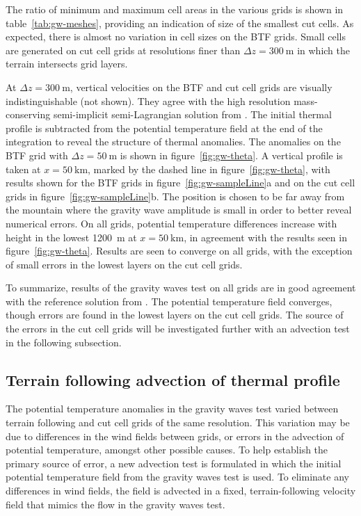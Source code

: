 \documentclass{ametsoc}
\begin{document}
The ratio of minimum and maximum cell areas in the various grids is shown in table~\ref{tab:gw-meshes}, providing an indication of size of the smallest cut cells.  As expected, there is almost no variation in cell sizes on the BTF grids.  Small cells are generated on cut cell grids at resolutions finer than $\Delta z = \SI{300}{\meter}$ in which the terrain intersects grid layers.

At $\Delta z = \SI{300}{\meter}$, vertical velocities on the BTF and cut cell grids are visually indistinguishable (not shown).  They agree with the high resolution mass-conserving semi-implicit semi-Lagrangian solution from \citet{melvin2010}.
The initial thermal profile is subtracted from the potential temperature field at the end of the integration to reveal the structure of thermal anomalies.  The anomalies on the BTF grid with $\Delta z = \SI{50}{\meter}$ is shown in figure~\ref{fig:gw-theta}.  A vertical profile is taken at $x = \SI{50}{\kilo\meter}$, marked by the dashed line in figure~\ref{fig:gw-theta}, with results shown for the BTF grids in figure~\ref{fig:gw-sampleLine}a and on the cut cell grids in figure~\ref{fig:gw-sampleLine}b.
The position is chosen to be far away from the mountain where the gravity wave amplitude is small in order to better reveal numerical errors.
On all grids, potential temperature differences increase with height in the lowest \SI{1200}{\meter} at $x = \SI{50}{\kilo\meter}$, in agreement with the results seen in figure~\ref{fig:gw-theta}.  Results are seen to converge on all grids, with the exception of small errors in the lowest layers on the cut cell grids.

To summarize, results of the gravity waves test on all grids are in good agreement with the reference solution from \citet{melvin2010}.  The potential temperature field converges, though errors are found in the lowest layers on the cut cell grids.  The source of the errors in the cut cell grids will be investigated further with an advection test in the following subsection.

\subsection{Terrain following advection of thermal profile}
The potential temperature anomalies in the gravity waves test varied between terrain following and cut cell grids of the same resolution.  This variation may be due to differences in the wind fields between grids, or errors in the advection of potential temperature, amongst other possible causes.  To help establish the primary source of error, a new advection test is formulated in which the initial potential temperature field from the gravity waves test is used.  To eliminate any differences in wind fields, the field is advected in a fixed, terrain-following velocity field that mimics the flow in the gravity waves test.
\end{document}
